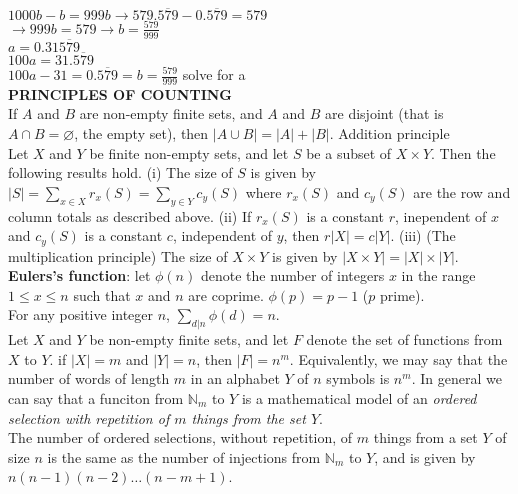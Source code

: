 \documentclass[10pt,landscape]{article}
\begin{document}
\begin{multicols}{4}
$1000b-b=999b \rightarrow 579.\overline{579}-0.\overline{579}=579$\\

$\rightarrow 999b=579 \rightarrow b=\frac{579}{999}$\\
$a=0.31\overline{579}$\\
$100a=31.\overline{579}$\\
$100a-31=0.\overline{579}=b=\frac{579}{999}$ solve for a\\

\textbf{PRINCIPLES OF COUNTING}\\

If $A$ and $B$ are non-empty finite sets, and $A$ and $B$ are disjoint
(that is $A \cap B = \varnothing$, the empty set), then $|A \cup B| =
|A| + |B|$. Addition principle\\

Let $X$ and $Y$ be finite non-empty sets, and let $S$ be a subset of
$X \times Y$. Then the following results hold.
(i) The size of $S$ is given by $|S| = \displaystyle\sum_{x \in X} r_{x}(S) =
\displaystyle\sum_{y \in Y} c_{y}(S)$ where $r_{x}(S)$ and $c_{y}(S)$
are the row and column totals as described above.
(ii) If $r_{x}(S)$ is a constant $r$, inependent of $x$ and $c_{y}(S)$
is a constant $c$, independent of $y$, then $r|X| = c|Y|$.
(iii) (The multiplication principle) The size of $X \times Y$ is given
by $|X \times Y| = |X| \times |Y|$.\\

\textbf{Eulers's function}: let $\phi(n)$ denote the number of
integers $x$ in the range $1 \leq x \leq n$ such that $x$ and $n$ are
coprime. $\phi(p) = p-1$ ($p$ prime).\\

For any positive integer $n$, $\displaystyle\sum_{d|n} \phi(d)=n$.\\

Let $X$ and $Y$ be non-empty finite sets, and let $F$ denote the set
of functions from $X$ to $Y$. if $|X| = m$ and $|Y| = n$, then $|F| =
n^{m}$. Equivalently, we may say that the number of words of length
$m$ in an alphabet $Y$ of $n$ symbols is $n^{m}$. In general we can
say that a funciton from $\mathbb{N}_{m}$ to $Y$ is a mathematical
model of an \textit{ordered selection with repetition of $m$ things
  from the set $Y$}.\\

The number of ordered selections, without repetition, of $m$ things
from a set $Y$ of size $n$ is the same as the number of injections
from $\mathbb{N}_{m}$ to $Y$, and is given by
$n(n-1)(n-2)\dots(n-m+1)$.\\


\end{multicols}
\end{document}
